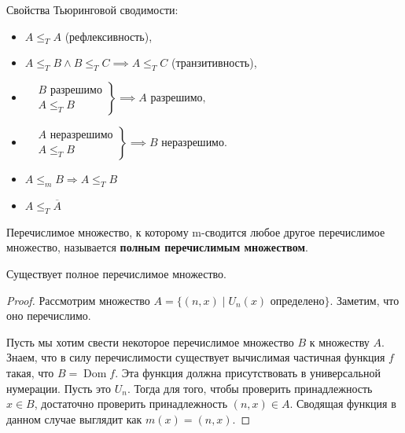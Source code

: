 Свойства Тьюринговой сводимости:
\begin{itemize}
    \item $A \leqslant_T A$ (рефлексивность),
    \item $A \leqslant_T B \wedge B \leqslant_T C \implies A \leqslant_T C$ (транзитивность),
    \item
    $
    \left.\begin{aligned}
            &B \text{ разрешимо}\\
            &A \leqslant_T B
    \end{aligned}\right\}
    \implies A \text{ разрешимо},
    $
    \item
    $
    \left.\begin{aligned}
            &A \text{ неразрешимо}\\
            &A \leqslant_T B
    \end{aligned}\right\}
    \implies B \text{ неразрешимо}.
    $
    \item $A \leqslant_m B \Rightarrow A \leqslant_T B$
    \item $A \leqslant_T \overline{A}$
\end{itemize}

\begin{definition}
    Перечислимое множество, к которому m-сводится любое другое перечислимое множество, называется
    \textbf{полным перечислимым множеством}.
\end{definition}

\begin{theorem}
    Существует полное перечислимое множество.
    \begin{proof}
        Рассмотрим множество $A = \{(n, x) \mid U_n(x) \text{ определено}\}$. Заметим, что оно
        перечислимо.
    
        Пусть мы хотим свести некоторое перечислимое множество $B$ к множеству $A$. Знаем, что
        в силу перечислимости существует вычислимая частичная функция $f$ такая, что $B
        = \operatorname{Dom} f$. Эта функция должна присутствовать в универсальной нумерации. Пусть
        это $U_n$. Тогда для того, чтобы проверить принадлежность $x \in B$, достаточно проверить
        принадлежность $(n, x) \in A$. Сводящая функция в данном случае выглядит как $m(x) = (n,
        x)$.
    \end{proof}
\end{theorem}